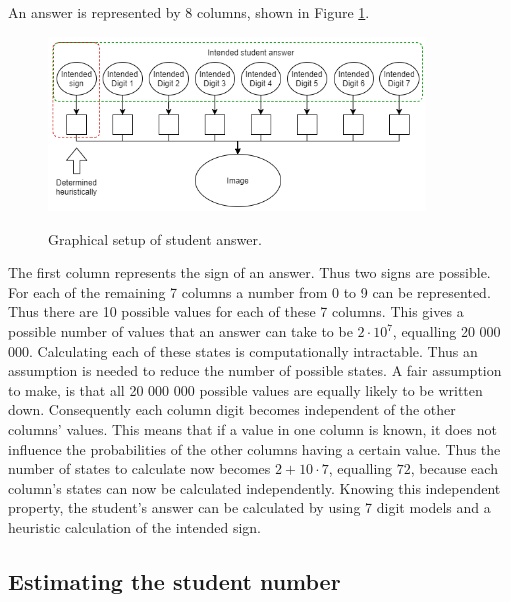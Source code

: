 An answer is represented by 8 columns, shown in Figure \ref{fig:stdAns}. \begin{figure}[b]
  \centering
  \includegraphics[width=10cm]{ans}\\
  \caption{Graphical setup of student answer.}
  \label{fig:stdAns}
\end{figure}The first column represents the sign of an answer. Thus two signs are possible. For each of the remaining 7 columns a number from 0 to 9 can be represented. Thus there are 10 possible values for each of these 7 columns. This gives a possible number of values that an answer can take to be $2\cdot 10^7$, equalling 20 000 000. Calculating each of these states is computationally intractable. Thus an assumption is needed to reduce the number of possible states. A fair assumption to make, is that all 20 000 000 possible values are equally likely to be written down. Consequently each column digit becomes independent of the other columns' values. This means that if a value in one column is known, it does not influence the probabilities of the other columns having a certain value. Thus the number of states to calculate now becomes $2+10\cdot 7$, equalling $72$, because each column's states can now be calculated independently. Knowing this independent property, the student's answer can be calculated by using 7 digit models and a heuristic calculation of the intended sign.



\subsection{Estimating the student number}
\label{sec:studentNumber}

